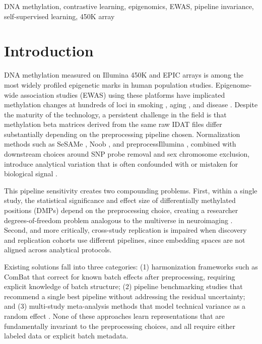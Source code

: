 \documentclass[conference]{IEEEtran}
\begin{document}
\begin{IEEEkeywords}
DNA methylation, contrastive learning, epigenomics, EWAS, pipeline invariance, self-supervised learning, 450K array
\end{IEEEkeywords}

\section{Introduction}

DNA methylation measured on Illumina 450K and EPIC arrays is among the most widely profiled epigenetic marks in human population studies. Epigenome-wide association studies (EWAS) using these platforms have implicated methylation changes at hundreds of loci in smoking \cite{joehanes2016}, aging \cite{hannum2013}, and disease \cite{rakyan2011}. Despite the maturity of the technology, a persistent challenge in the field is that methylation beta matrices derived from the same raw IDAT files differ substantially depending on the preprocessing pipeline chosen. Normalization methods such as SeSAMe \cite{zhou2018}, Noob \cite{triche2013}, and preprocessIllumina \cite{aryee2014}, combined with downstream choices around SNP probe removal and sex chromosome exclusion, introduce analytical variation that is often confounded with or mistaken for biological signal \cite{fortin2014, dedeurwaerder2011}.

This pipeline sensitivity creates two compounding problems. First, within a single study, the statistical significance and effect size of differentially methylated positions (DMPs) depend on the preprocessing choice, creating a researcher degrees-of-freedom problem analogous to the multiverse in neuroimaging \cite{steegen2016}. Second, and more critically, cross-study replication is impaired when discovery and replication cohorts use different pipelines, since embedding spaces are not aligned across analytical protocols.

Existing solutions fall into three categories: (1) harmonization frameworks such as ComBat \cite{johnson2007} that correct for known batch effects after preprocessing, requiring explicit knowledge of batch structure; (2) pipeline benchmarking studies \cite{fortin2014, pidsley2013} that recommend a single best pipeline without addressing the residual uncertainty; and (3) multi-study meta-analysis methods that model technical variance as a random effect \cite{mansell2019}. None of these approaches learn representations that are fundamentally invariant to the preprocessing choices, and all require either labeled data or explicit batch metadata.
\end{document}
